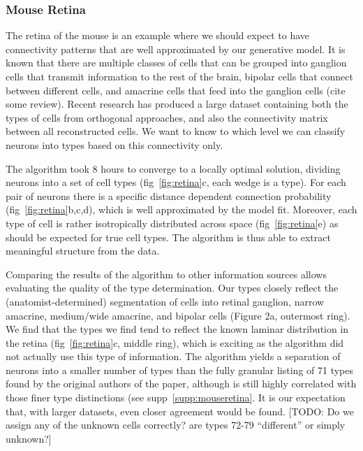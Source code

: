 \documentclass{article}
\begin{document}
\subsubsection{Mouse Retina}
The retina of the mouse \autocite{Masland2001} is an example where we
should expect to have connectivity patterns that are well approximated
by our generative model. It is known that there are multiple classes
of cells that can be grouped into ganglion cells that transmit
information to the rest of the brain, bipolar cells that connect
between different cells, and amacrine cells that feed into the
ganglion cells (cite some review). Recent research \autocite{Helmstaedter2013} has
produced a large dataset containing both the types of cells from
orthogonal approaches, and also the connectivity matrix between all
reconstructed cells. We want to know to which level we can classify
neurons into types based on this connectivity only.

The algorithm took 8 hours to converge to a locally optimal solution,
dividing neurons into a set of cell types (fig~\ref{fig:retina}c, each
wedge is a type). For each pair of neurons there is a specific
distance dependent connection probability (fig~\ref{fig:retina}b,c,d),
which is well approximated by the model fit. Moreover, each type of
cell is rather isotropically distributed across space
(fig~\ref{fig:retina}e) as should be expected for true cell types. The
algorithm is thus able to extract meaningful structure from the data.

Comparing the results of the algorithm to other information sources
allows evaluating the quality of the type determination. Our types
closely reflect the (anatomist-determined) segmentation of cells into
retinal ganglion, narrow amacrine, medium/wide amacrine, and bipolar
cells (Figure 2a, outermost ring). We find that the types we find tend
to reflect the known laminar distribution in the retina
(fig~\ref{fig:retina}c, middle ring), which is exciting as the
algorithm did not actually use this type of information. The algorithm
yields a separation of neurons into a smaller number of types than the fully
granular listing of 71 types found by the original authors of the paper, 
although is still highly correlated with those finer type distinctions (see supp~\ref{supp:mouseretina}. It is our expectation that, with larger datasets, 
even closer agreement would be found.  [TODO:
Do we assign any of the unknown cells correctly?  are types 72-79
“different” or simply unknown?]
\end{document}
